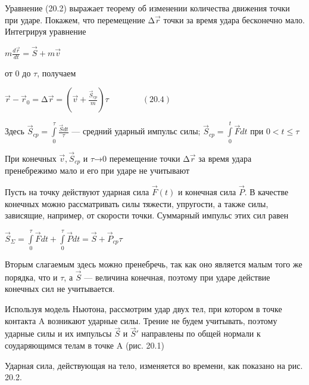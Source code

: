 {\begin{center}
\par Уравнение (20.2) выражает теорему об изменении количества движения точки при ударе. Покажем, что перемещение $∆\vec{r}$ точки за время удара бесконечно мало. Интегрируя уравнение

\par $m\frac{d\vec{r}}{dt}=\vec{S}+m\vec{v}$

\par от 0 до $\tau$, получаем

\par $\vec{r}-\vec{r}_0 = ∆\vec{r} = (\vec{v} + \frac{\vec{S}_{cp}}{m})\tau \qquad \qquad (20.4) $

\par Здесь $\vec{S}_{cp} = \int\limits_0^\tau \frac{\vec{S}dt}{\tau}$ — средний ударный импульс силы;
      $\vec{S}_{cp} = \int\limits_0^t \vec{F}dt$ при $0 < t \leqslant \tau$

\par При конечных $\vec{v},  \vec{S}_{cp}$ и $\tau$→0  перемещение точки $∆\vec{r}$ за время удара пренебрежимо мало и его при ударе не учитывают

\par Пусть на точку действуют ударная сила $\vec{F}(t)$ и конечная сила $\vec{P}$. В качестве конечных можно рассматривать силы тяжести, упругости, а также силы, зависящие, например, от скорости точки. Суммарный импульс этих сил равен

\par $\vec{S}_\Sigma = \int\limits_0^\tau \vec{F}dt + \int\limits_0^\tau \vec{P}dt = 
\vec{S} + \vec{P}_{cp}\tau$

\par Вторым слагаемым здесь можно пренебречь, так как оно является малым того же порядка, что и $\tau$, а $\vec{S}$  — величина конечная, поэтому при ударе действие конечных сил не учитывается.

\par Используя модель Ньютона, рассмотрим удар двух тел, при котором в точке контакта A возникают ударные силы. Трение не будем учитывать, поэтому ударные силы и их импульсы $\vec{S}$  и $\vec{S}'$  направлены по общей нормали к соударяющимся телам в точке A (рис. 20.1)

\par Ударная сила, действующая на тело, изменяется во времени, как показано на рис. 20.2.


\end{center}}
